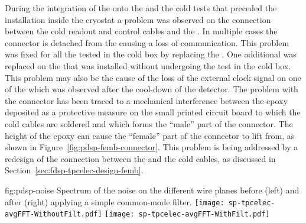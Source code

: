 During the integration of the  onto the 
and the cold tests that preceded the  installation
inside the  cryostat a problem was observed on the 
connection between the cold readout and control cables and the
. In multiple cases the connector is detached from
the  causing a loss of communication. This problem 
was fixed for all the  tested in the cold box by
replacing the . One additional  was 
replaced on the  that was installed without undergoing 
the test in the cold box. This problem may also be the cause
of the loss of the external clock signal on one of the 
which was observed after the cool-down of the detector. The problem 
with the connector has been traced to a mechanical interference between 
the epoxy deposited as a protective measure on the small printed circuit
board to which the cold cables are soldered and which forms the
``male'' part of the connector. The height of the epoxy can cause
the ``female'' part of the connector to lift from, as shown in
Figure~\ref{fig:pdsp-femb-connector}. This problem is being 
addressed by a redesign of the connection between the 
and the cold cables, as discussed in Section~\ref{sec:fdsp-tpcelec-design-femb}.

\begin{dunefigure}
{fig:pdsp-noise}
{Spectrum of the noise on the different   wire planes before
(left) and after (right) applying a simple common-mode filter.}
\texttt{[image: sp-tpcelec-avgFFT-WithoutFilt.pdf]}
\texttt{[image: sp-tpcelec-avgFFT-WithFilt.pdf]}
\end{dunefigure}

